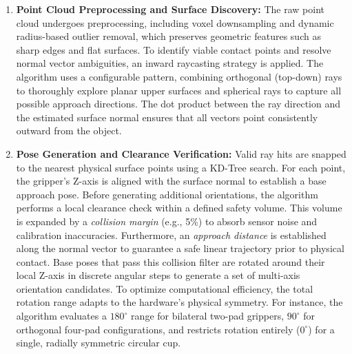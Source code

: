 \documentclass[12pt, a4paper]{article}
\begin{document}
\begin{enumerate}
    \item \textbf{Point Cloud Preprocessing and Surface Discovery:}
    The raw point cloud undergoes preprocessing, including voxel downsampling and dynamic radius-based outlier removal, which preserves geometric features such as sharp edges and flat surfaces. To identify viable contact points and resolve normal vector ambiguities, an inward raycasting strategy is applied. The algorithm uses a configurable pattern, combining orthogonal (top-down) rays to thoroughly explore planar upper surfaces and spherical rays to capture all possible approach directions. The dot product between the ray direction and the estimated surface normal ensures that all vectors point consistently outward from the object.

    \item \textbf{Pose Generation and Clearance Verification:}
    Valid ray hits are snapped to the nearest physical surface points using a KD-Tree search. For each point, the gripper's Z-axis is aligned with the surface normal to establish a base approach pose. Before generating additional orientations, the algorithm performs a local clearance check within a defined safety volume. This volume is expanded by a \textit{collision margin} (e.g., 5\%) to absorb sensor noise and calibration inaccuracies. Furthermore, an \textit{approach distance} is established along the normal vector to guarantee a safe linear trajectory prior to physical contact. Base poses that pass this collision filter are rotated around their local Z-axis in discrete angular steps to generate a set of multi-axis orientation candidates. To optimize computational efficiency, the total rotation range adapts to the hardware's physical symmetry. For instance, the algorithm evaluates a $180^\circ$ range for bilateral two-pad grippers, $90^\circ$ for orthogonal four-pad configurations, and restricts rotation entirely ($0^\circ$) for a single, radially symmetric circular cup.


\end{enumerate}
\end{document}

